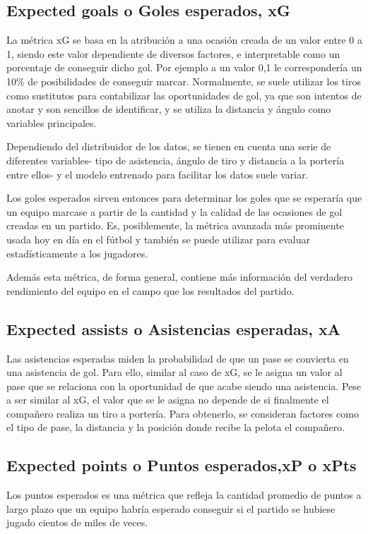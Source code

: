 \subsection{Expected goals o Goles esperados, xG}
La métrica xG se basa en la atribución a una ocasión creada de 
un valor entre 0 a 1, siendo este valor dependiente de diversos 
factores, e interpretable como un porcentaje de conseguir dicho gol. 
Por ejemplo a un valor 0,1 le correspondería un 10\% de posibilidades 
de conseguir marcar. Normalmente, se suele utilizar los tiros 
como sustitutos para contabilizar las oportunidades de gol, 
ya que son intentos de anotar y son sencillos de identificar, 
y se utiliza la distancia y ángulo como variables principales.

Dependiendo del distribuidor de los datos, se tienen en cuenta una 
serie de diferentes variables- tipo de asistencia, ángulo de tiro y 
distancia a la portería entre ellos- y el modelo entrenado para 
facilitar los datos suele variar.

Los goles esperados sirven entonces para determinar 
los goles que se esperaría que un equipo marcase a partir de 
la cantidad y la calidad de las ocasiones de gol creadas en un 
partido. Es, posiblemente, la métrica avanzada más prominente 
usada hoy en día en el fútbol y también se puede utilizar para 
evaluar estadísticamente a los jugadores.

Además esta métrica, de forma general, contiene más información 
del verdadero rendimiento del equipo en el campo que los 
resultados del partido.

\subsection{Expected assists o Asistencias esperadas, xA}
Las asistencias esperadas miden la probabilidad de que un pase se 
convierta en una asistencia de gol. Para ello, similar al caso de xG, 
se le asigna un valor al pase que se relaciona con la oportunidad 
de que acabe siendo una asistencia. Pese a ser similar al xG, el 
valor que se le asigna no depende de si finalmente el compañero 
realiza un tiro a portería. Para obtenerlo, se consideran factores 
como el tipo de pase, la distancia y la posición donde recibe la 
pelota el compañero.

\subsection{Expected points o Puntos esperados,xP o xPts}
Los puntos esperados es una métrica que refleja la cantidad 
promedio de puntos a largo plazo que un equipo habría 
esperado conseguir si el partido se hubiese jugado cientos de miles de veces.

